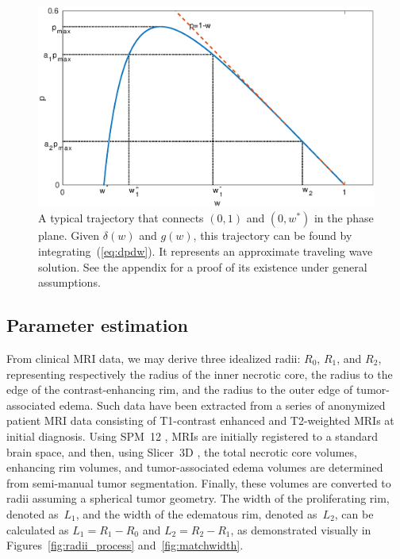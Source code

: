 \documentclass{aims}
\numberwithin{equation}{section}
\begin{document}
\begin{figure}
\begin{center}
\includegraphics[scale=0.55]{plots/pp.eps}
\end{center}
\caption{A typical trajectory that connects $(0,1)$ and $(0,w^*)$ in the phase plane. Given $\delta(w)$ and $g(w)$, this trajectory can be found by integrating~(\ref{eq:dpdw}).  It represents an approximate traveling wave solution.  See the appendix for a proof of its existence under general assumptions.}
\label{fig:pp}
\end{figure}


\subsection{Parameter estimation}
\label{paramest-sec}

From clinical MRI data, we may derive three idealized radii:
$R_{0}$, $R_{1}$, and $R_{2}$, representing respectively the radius of the
inner necrotic core, the radius to the edge of the contrast-enhancing rim,
and the radius to the outer edge of tumor-associated edema.  Such data have
been extracted from a series of anonymized patient MRI data consisting of
T1-contrast enhanced and T2-weighted MRIs at initial diagnosis.  Using
SPM~12 \cite{Penny2007}, MRIs are initially registered to a standard brain
space, and then, using Slicer~3D \cite{Fedorov2012}, the total necrotic core
volumes, enhancing rim volumes, and tumor-associated edema volumes are
determined from semi-manual tumor segmentation.  Finally, these volumes are
converted to radii assuming a spherical tumor geometry.  The width of the
proliferating rim, denoted as~$L_{1}$, and the width of the edematous rim,
denoted as~$L_{2}$, can be calculated as $L_{1}=R_{1}-R_{0}$ and
$L_{2}=R_{2}-R_{1}$, as demonstrated visually in
Figures~\ref{fig:radii_process} and~\ref{fig:matchwidth}.
\end{document}

